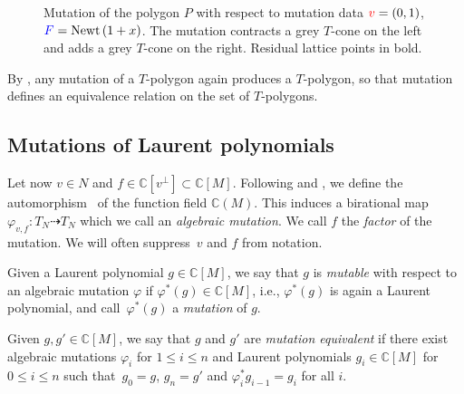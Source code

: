 \documentclass[pdftex]{sigma}
\numberwithin{equation}{section}
\DeclareMathOperator{\Newt}{{Newt \,}}
\newcommand{\CC}{\mathbb{C}}
\begin{document}
\begin{figure}[t]
		\caption{Mutation of the polygon $P$ with respect to mutation data $\textcolor{red}{v}=(0,1)$, $\textcolor{blue}{F}=\Newt(1+x)$. The mutation contracts a grey $T$-cone on the left and adds a grey $T$-cone on the right. Residual lattice points in bold.}
		\label{fig:combinatorialmutation}
	\end{figure}
	By \cite[Proposition 3.6]{AkhtarKasprzyk}, any mutation of a $T$-polygon again produces a $T$-polygon, so that mutation defines an equivalence relation on the set of $T$-polygons.
	\subsection{Mutations of Laurent polynomials}\label{sec:mutationsofLaurent}
	Let now $v \in N$ and $f \in \CC[v^\perp] \subset \CC[M]$. Following \cite{GrossHackingKeelClusterAlgebras} and \cite{AkhtarCoatesCorti}, we define the automorphism~
	of the function field $\CC(M)$. This
 induces a birational map
${\varphi_{v,f} \colon T_N \dashrightarrow T_N}$
	which we call an \emph{algebraic mutation}. We call $f$ the \emph{factor} of the mutation. We will often suppress~$v$ and $f$ from notation.
	\begin{Definition}\label{def:AlgebraicMutation}
		Given a Laurent polynomial $g \in \CC[M]$, we say that $g$ is {\it mutable} with respect to an algebraic mutation $\varphi$ if $\varphi^*(g)\in \CC[M]$, i.e., $\varphi^*(g)$ is again a Laurent polynomial, and call~$\varphi^*(g)$ a \emph{mutation} of $g$.

		Given $g, g' \in \CC[M]$, we say that $g$ and $g'$ are \emph{mutation equivalent} if there exist algebraic mutations $\varphi_i$ for $1 \leq i \leq n$ and Laurent polynomials $g_i \in \CC[M]$ for $0 \leq i \leq n$ such that~${g_0=g}$, ${g_n=g'}$ and $\varphi_i^*g_{i-1}=g_{i}$ for all $i$.
	\end{Definition}
\end{document}
